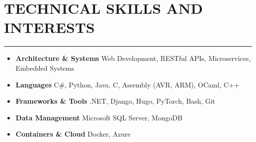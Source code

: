 \section*{TECHNICAL SKILLS AND INTERESTS}

\hrule \relax
\sectionheaderspace

\begin{itemize}[noitemsep,nolistsep, label={}]
	\item \textbf{Architecture \& Systems} \tabto*{5cm} Web Development,  RESTful APIs,  Microservices, Embedded Systems
	\item \textbf{Languages} \tabto*{5cm} C\#, Python, Java, C, Assembly (AVR, ARM), OCaml, C++
	\item \textbf{Frameworks \& Tools} \tabto*{5cm} .NET, Django, Hugo, PyTorch, Bash, Git
	\item \textbf{Data Management} \tabto*{5cm} Microsoft SQL Server, MongoDB
	\item \textbf{Containers \& Cloud} \tabto*{5cm}  Docker, Azure
\end{itemize}
\subsectionspace